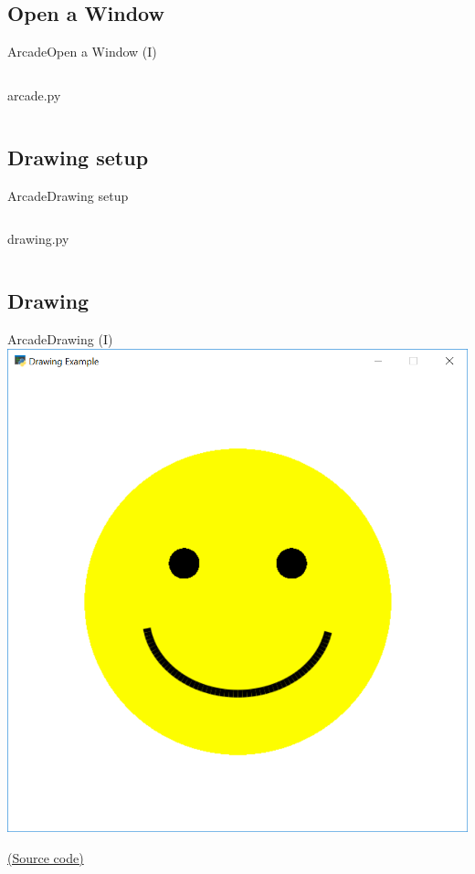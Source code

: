 \documentclass[10pt,compress]{beamer} %
\begin{document}
\subsection{Open a Window}
\begin{frame}{Arcade}{Open a Window (I)}
	\begin{columns}
		\vspace{-0.2cm}
		\begin{exampleblock}{arcade.py}
		\vspace{-0.2cm}
		
		\vspace{-0.2cm}
		\end{exampleblock}
	\end{columns}
\end{frame}

\subsection{Drawing setup}
\begin{frame}{Arcade}{Drawing setup}
	\begin{columns}
 	   \column{0.80\textwidth}
		\vspace{-0.2cm}
		\begin{exampleblock}{drawing.py}
		\vspace{-0.2cm}
		
		\vspace{-0.2cm}
		\end{exampleblock}
	\end{columns}
\end{frame}

\subsection{Drawing}

\begin{frame}{Arcade}{Drawing (I)}
	\centering \includegraphics[width=0.5\linewidth]{figs/smile.png}
    \bigskip

    \href{https://api.arcade.academy/en/latest/examples/happy_face.html}{(Source code)}
\end{frame}
\end{document}
